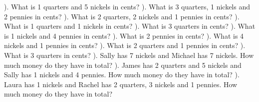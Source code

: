 \documentclass{article}%
\begin{document}
). What is 1 quarters and 5 nickels in cents?%
\newline%
\newline%
). What is 3 quarters, 1 nickels and 2 pennies in cents?%
\newline%
\newline%
). What is 2 quarters, 2 nickels and 1 pennies in cents?%
\newline%
\newline%
). What is 1 quarters and 1 nickels in cents?%
\newline%
\newline%
). What is 3 quarters in cents?%
\newline%
\newline%
). What is 1 nickels and 4 pennies in cents?%
\newline%
\newline%
). What is 2 pennies in cents?%
\newline%
\newline%
). What is 4 nickels and 1 pennies in cents?%
\newline%
\newline%
). What is 2 quarters and 1 pennies in cents?%
\newline%
\newline%
). What is 3 quarters in cents?%
\newline%
\newline%
). Sally has 7 nickels and Michael has 7 nickels. How much money do they have in total?%
\newline%
\newline%
). James has 2 quarters and 5 nickels and Sally has 1 nickels and 4 pennies. How much money do they have in total?%
\newline%
\newline%
). Laura has 1 nickels and Rachel has 2 quarters, 3 nickels and 1 pennies. How much money do they have in total?%
\end{document}
